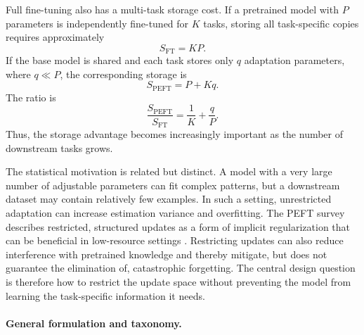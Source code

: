 Full fine-tuning also has a multi-task storage cost. If a pretrained model
with $P$ parameters is independently fine-tuned for $K$ tasks, storing all
task-specific copies requires approximately
\begin{equation}
    S_{\mathrm{FT}}=KP.
    \label{eq:peft-ft-storage}
\end{equation}
If the base model is shared and each task stores only $q$ adaptation
parameters, where $q\ll P$, the corresponding storage is
\begin{equation}
    S_{\mathrm{PEFT}}=P+Kq.
    \label{eq:peft-storage}
\end{equation}
The ratio is
\begin{equation}
    \frac{S_{\mathrm{PEFT}}}{S_{\mathrm{FT}}}
    =
    \frac{1}{K}+\frac{q}{P}.
    \label{eq:peft-storage-ratio}
\end{equation}
Thus, the storage advantage becomes increasingly important as the number of
downstream tasks grows.

The statistical motivation is related but distinct. A model with a very large
number of adjustable parameters can fit complex patterns, but a downstream
dataset may contain relatively few examples. In such a setting, unrestricted
adaptation can increase estimation variance and overfitting. The PEFT survey
describes restricted, structured updates as a form of implicit
regularization that can be beneficial in low-resource settings
\parencite{prottasha2025peft}. Restricting updates can also reduce interference
with pretrained knowledge and thereby mitigate, but does not guarantee the
elimination of, catastrophic forgetting. The central design question is
therefore how to restrict the update space without preventing the model from
learning the task-specific information it needs.

\paragraph{General formulation and taxonomy.}

